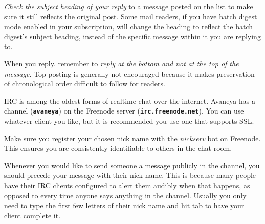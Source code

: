 \item
{\it Check the subject heading of your reply} to a message posted on the list to make sure it still reflects the original post. Some mail readers, if you have batch digest mode enabled in your subscription, will change the heading to reflect the batch digest's subject heading, instead of the specific message within it you are replying to.

\item
When you reply, remember to {\it reply at the bottom and not at the top of the message}. Top posting is generally not encouraged because it makes preservation of chronological order difficult to follow for readers.
\stopitemize


IRC is among the oldest forms of realtime chat over the internet. Avaneya has a channel ({\bf \tt \type{#}avaneya}) on the Freenode server ({\bf \tt irc.freenode.net}). You can use whatever client you like, but it is recommended you use one that supports SSL.

Make sure you register your chosen nick name with the {\it nickserv} bot on Freenode. This ensures you are consistently identifiable to others in the chat room.

Whenever you would like to send someone a message publicly in the channel, you should precede your message with their nick name. This is because many people have their IRC clients configured to alert them audibly when that happens, as opposed to every time anyone says anything in the channel. Usually you only need to type the first few letters of their nick name and hit tab to have your client complete it.


